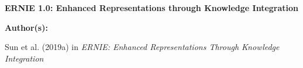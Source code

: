 

\begin{frame}{}
    \begin{center}
        \large \textbf{ERNIE 1.0: Enhanced Representations through Knowledge Integration}
    \end{center}
    \vspace{20pt}
    
    \textbf{Author(s):}
    \begin{itemizeSpaced}{5pt}
    {\color{DimGrey} 
    
        \item Sun et al. (2019a) in \emph{ERNIE: Enhanced Representations Through Knowledge Integration}
        
    }
    \end{itemizeSpaced}
\end{frame}





